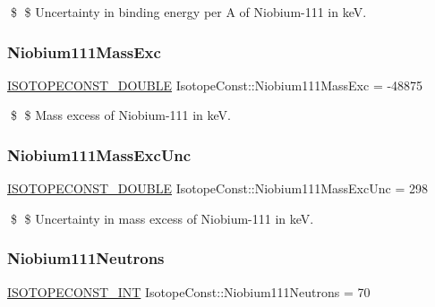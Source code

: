 \$ \$ Uncertainty in binding energy per A of Niobium-\/111 in keV. \mbox{\label{group___isotope_const-_niobium-_nb111_gada42d1836c7c206400d313452150ffae}} 
\subsubsection{\texorpdfstring{Niobium111\+Mass\+Exc}{Niobium111MassExc}}
{\footnotesize\ttfamily \mbox{\hyperlink{group___isotope_const-_macros_ga8f45a7272ce02c0b4c65c44636ed719a}{I\+S\+O\+T\+O\+P\+E\+C\+O\+N\+S\+T\+\_\+\+D\+O\+U\+B\+LE}} Isotope\+Const\+::\+Niobium111\+Mass\+Exc = -\/48875}

\$ \$ Mass excess of Niobium-\/111 in keV. \mbox{\label{group___isotope_const-_niobium-_nb111_ga79735177c79e39007d8502cd3cebdc13}} 
\subsubsection{\texorpdfstring{Niobium111\+Mass\+Exc\+Unc}{Niobium111MassExcUnc}}
{\footnotesize\ttfamily \mbox{\hyperlink{group___isotope_const-_macros_ga8f45a7272ce02c0b4c65c44636ed719a}{I\+S\+O\+T\+O\+P\+E\+C\+O\+N\+S\+T\+\_\+\+D\+O\+U\+B\+LE}} Isotope\+Const\+::\+Niobium111\+Mass\+Exc\+Unc = 298}

\$ \$ Uncertainty in mass excess of Niobium-\/111 in keV. \mbox{\label{group___isotope_const-_niobium-_nb111_ga7fa8a1a8e81c6b79d46503c0c78e1685}} 
\subsubsection{\texorpdfstring{Niobium111\+Neutrons}{Niobium111Neutrons}}
{\footnotesize\ttfamily \mbox{\hyperlink{group___isotope_const-_macros_ga5f18360b3e99483a35c32d789e62621c}{I\+S\+O\+T\+O\+P\+E\+C\+O\+N\+S\+T\+\_\+\+I\+NT}} Isotope\+Const\+::\+Niobium111\+Neutrons = 70}

